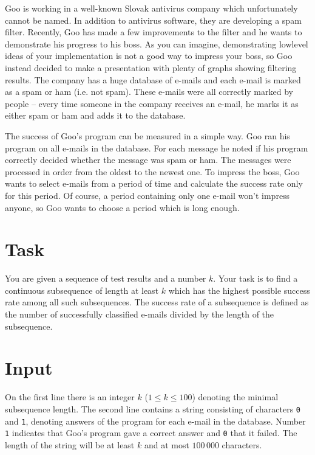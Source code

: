 
\noindent
Goo is working in a well-known Slovak antivirus company
which unfortunately cannot be named. In addition to antivirus
software, they are developing a spam filter. Recently, Goo has
made a few improvements to the filter and he wants to demonstrate
his progress to his boss. As you can imagine, demonstrating lowlevel ideas of your implementation is not a good way to impress
your boss, so Goo instead decided to make a presentation with
plenty of graphs showing filtering results. The company has a
huge database of e-mails and each e-mail is marked as a spam or
ham (i.e. not spam). These e-mails were all correctly marked by
people -- every time someone in the company receives an e-mail,
he marks it as either spam or ham and adds it to the database.

The success of Goo's program can be measured in a simple
way. Goo ran his program on all e-mails in the database. For each
message he noted if his program correctly decided whether the message was spam or ham. The messages were
processed in order from the oldest to the newest one. To impress the boss, Goo wants to select e-mails from a
period of time and calculate the success rate only for this period. Of course, a period containing only one e-mail
won’t impress anyone, so Goo wants to choose a period which is long enough.


\section*{Task}
You are given a sequence of test results and a number $k$. Your task is to find a continuous subsequence of length at
least $k$ which has the highest possible success rate among all such subsequences. The success rate of a subsequence
is defined as the number of successfully classified e-mails divided by the length of the subsequence.

\section*{Input}
On the first line there is an integer $k$ ($1 \le k \le 100$) denoting the minimal subsequence length. The second line
contains a string consisting of characters \texttt{0} and \texttt{1}, denoting answers of the program for each e-mail in the database.
Number \texttt{1} indicates that Goo’s program gave a correct answer and \texttt{0} that it failed. The length of the string will be
at least $k$ and at most $100\,000$ characters.

